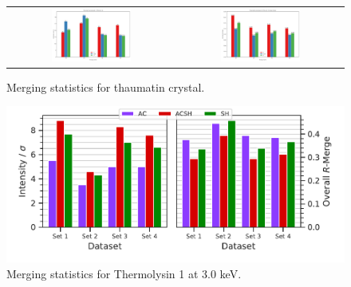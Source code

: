 \begin{figure}[h]
    \centering
    \begin{tabular}{cc}
    \includegraphics[width = 0.5\textwidth]{plots/exp0/thaum_Isig.png} & \includegraphics[width = 0.5\textwidth]{plots/exp0/thaum_rmerges.png}
    \end{tabular}
    \caption{Merging statistics for thaumatin crystal.}
    \label{fig:thaum1_stats}
\end{figure}


\newpage

\begin{figure}
    \centering
    \includegraphics{plots/exp1/tlys_9_P6122/3p0_stats_grid.pdf}
    \caption{Merging statistics for Thermolysin 1 at 3.0 \unit{keV}.}
    \label{fig:tlys_9_3p0}
\end{figure}

